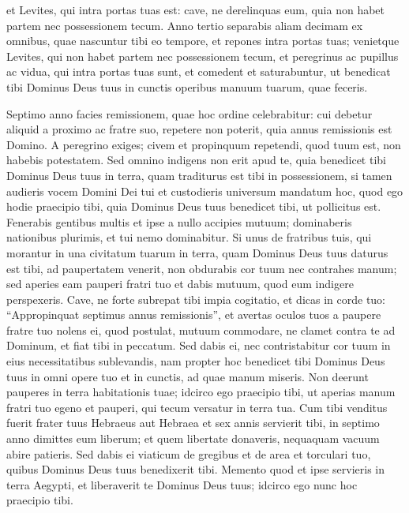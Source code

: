 \begin{biblechapter}
\begin{biblechapter}
\begin{biblechapter}
\begin{biblechapter}
\begin{biblechapter}
\begin{biblechapter}
\begin{biblechapter}
\begin{biblechapter}
\begin{biblechapter}
\begin{biblechapter}
\begin{biblechapter}
\begin{biblechapter}
\begin{biblechapter}
\begin{biblechapter}
\verse et Levites, qui intra portas tuas est: cave, ne derelinquas eum, quia non habet partem nec possessionem tecum.
 \verse Anno tertio separabis aliam decimam ex omnibus, quae nascuntur tibi eo tempore, et repones intra portas tuas; 
\verse venietque Levites, qui non habet partem nec possessionem tecum, et peregrinus ac pupillus ac vidua, qui intra portas tuas sunt, et comedent et saturabuntur, ut benedicat tibi Dominus Deus tuus in cunctis operibus manuum tuarum, quae feceris.
 
\begin{biblechapter}
\verse Septimo anno facies remissionem, 
\verse quae hoc ordine celebrabitur: cui debetur aliquid a proximo ac fratre suo, repetere non poterit, quia annus remissionis est Domino. 
 \verse A peregrino exiges; civem et propinquum repetendi, quod tuum est, non habebis potestatem. 
\verse Sed omnino indigens non erit apud te, quia benedicet tibi Dominus Deus tuus in terra, quam traditurus est tibi in possessionem, 
\verse si tamen audieris vocem Domini Dei tui et custodieris universum mandatum hoc, quod ego hodie praecipio tibi, 
\verse quia Dominus Deus tuus benedicet tibi, ut pollicitus est. Fenerabis gentibus multis et ipse a nullo accipies mutuum; dominaberis nationibus plurimis, et tui nemo dominabitur.
 \verse Si unus de fratribus tuis, qui morantur in una civitatum tuarum in terra, quam Dominus Deus tuus daturus est tibi, ad paupertatem venerit, non obdurabis cor tuum nec contrahes manum; 
\verse sed aperies eam pauperi fratri tuo et dabis mutuum, quod eum indigere perspexeris. 
\verse Cave, ne forte subrepat tibi impia cogitatio, et dicas in corde tuo: “Appropinquat septimus annus remissionis”, et avertas oculos tuos a paupere fratre tuo nolens ei, quod postulat, mutuum commodare, ne clamet contra te ad Dominum, et fiat tibi in peccatum. 
\verse Sed dabis ei, nec contristabitur cor tuum in eius necessitatibus sublevandis, nam propter hoc benedicet tibi Dominus Deus tuus in omni opere tuo et in cunctis, ad quae manum miseris. 
\verse Non deerunt pauperes in terra habitationis tuae; idcirco ego praecipio tibi, ut aperias manum fratri tuo egeno et pauperi, qui tecum versatur in terra tua.
 \verse Cum tibi venditus fuerit frater tuus Hebraeus aut Hebraea et sex annis servierit tibi, in septimo anno dimittes eum liberum; 
\verse et quem libertate donaveris, nequaquam vacuum abire patieris. 
\verse Sed dabis ei viaticum de gregibus et de area et torculari tuo, quibus Dominus Deus tuus benedixerit tibi. 
 \verse Memento quod et ipse servieris in terra Aegypti, et liberaverit te Dominus Deus tuus; idcirco ego nunc hoc praecipio tibi. 

\end{biblechapter}
\end{biblechapter}
\end{biblechapter}
\end{biblechapter}
\end{biblechapter}
\end{biblechapter}
\end{biblechapter}
\end{biblechapter}
\end{biblechapter}
\end{biblechapter}
\end{biblechapter}
\end{biblechapter}
\end{biblechapter}
\end{biblechapter}
\end{biblechapter}

